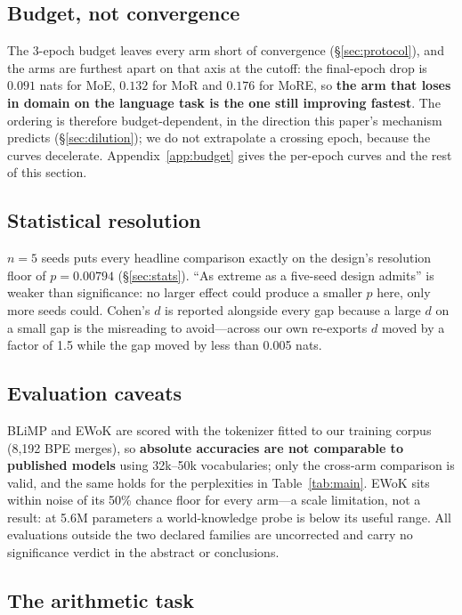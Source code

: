 \subsection*{Budget, not convergence}\label{sec:budget} The 3-epoch budget leaves every arm short of convergence (\S\ref{sec:protocol}), and the arms are furthest apart on that axis at the cutoff: the final-epoch drop is $0.091$ nats for MoE, $0.132$ for MoR and $0.176$ for MoRE, so \textbf{the arm that loses in domain on the language task is the one still improving fastest}. The ordering is therefore budget-dependent, in the direction this paper's mechanism predicts (\S\ref{sec:dilution}); we do not extrapolate a crossing epoch, because the curves decelerate. Appendix~\ref{app:budget} gives the per-epoch curves and the rest of this section.

\subsection*{Statistical resolution}

$n = 5$ seeds puts every headline comparison exactly on the design's resolution
floor of $p = 0.00794$ (\S\ref{sec:stats}). ``As extreme as a five-seed design
admits'' is weaker than significance: no larger effect could produce a smaller $p$
here, only more seeds could. Cohen's
$d$ is reported alongside every gap because a large $d$ on a small gap is the
misreading to avoid---across our own re-exports $d$ moved by a factor of 1.5 while
the gap moved by less than 0.005 nats.

\subsection*{Evaluation caveats}

BLiMP and EWoK are scored with the tokenizer fitted to our training corpus
(8{,}192 BPE merges), so \textbf{absolute accuracies are not comparable to
published models} using 32k--50k vocabularies; only the cross-arm comparison is
valid, and the same holds for the perplexities in Table~\ref{tab:main}. EWoK sits
within noise of its 50\% chance floor for every arm---a scale limitation, not a
result: at 5.6M parameters a world-knowledge probe is below its useful range. All
evaluations outside the two declared families are uncorrected and carry no
significance verdict in the abstract or conclusions.

\subsection*{The arithmetic task}


